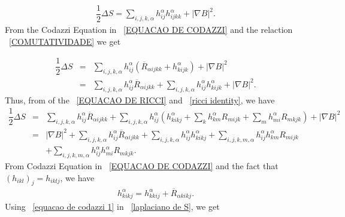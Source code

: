 \documentclass[leqno,11pt]{amsart}
\theoremstyle{plain}
\theoremstyle{definition}
\numberwithin{equation}{section}
\begin{document}
\begin{eqnarray*}
\dfrac{1}{2}\Delta S=\sum_{i,j,k,\alpha}h_{ij}^{\alpha}h_{ijkk}^{\alpha}+|\nabla B|^2.
\end{eqnarray*}
From the Codazzi Equation in ~\eqref{EQUACAO DE CODAZZI}
and the relaction ~\eqref{COMUTATIVIDADE} we get

\begin{eqnarray*}
\dfrac{1}{2}\Delta S&=&\sum_{i,j,k,\alpha}h_{ij}^{\alpha}\left(\overline{R}_{\alpha ijkk}+h_{kijk}^{\alpha}\right)+|\nabla B|^2\\
&=&\sum_{i,j,k,\alpha}h_{ij}^{\alpha}\overline{R}_{\alpha ijkk}+\sum_{i,j,k,\alpha}h_{ij}^{\alpha}h_{kijk}^{\alpha}+|\nabla B|^2.
\end{eqnarray*}
Thus, from of the ~\eqref{EQUACAO DE RICCI} and ~\eqref{ricci identity}, we have
\begin{eqnarray}\label{laplaciano de S}
\dfrac{1}{2}\Delta S&=&\sum_{i,j,k,\alpha}h_{ij}^{\alpha}\overline{R}_{\alpha ijkk}+\sum_{i,j,k,\alpha}h_{ij}^{\alpha}\left(h_{kikj}^{\alpha}+\sum_{k}h_{km}^{\alpha}R_{mijk}+\sum_{m}h_{mi}^{\alpha}R_{mkjk}\right)+|\nabla B|^2\nonumber \\
&=&|\nabla B|^2+\sum_{i,j,k,\alpha}h_{ij}^{\alpha}\overline{R}_{\alpha ijkk}+\sum_{i,j,k,\alpha}h_{ij}^{\alpha}h_{kikj}^{\alpha} +\sum_{i,j,k,m,\alpha}h_{ij}^{\alpha}h_{km}^{\alpha}R_{mijk} \nonumber \\ &&+\sum_{i,j,k,m,\alpha}h_{ij}^{\alpha}h_{mi}^{\alpha}R_{mkjk}.
\end{eqnarray}
From Codazzi Equation in ~\eqref{EQUACAO DE CODAZZI} and the fact that $(h_{ikl})_j=h_{iklj}$, we have
\begin{eqnarray}\label{equacao de codazzi 1}
h_{kikj}^{\alpha}=h_{kkij}^{\alpha}+\overline{R}_{\alpha kikj}.
\end{eqnarray}
Using ~\eqref{equacao de codazzi 1} in ~\eqref{laplaciano de S}, we get
\end{document}
